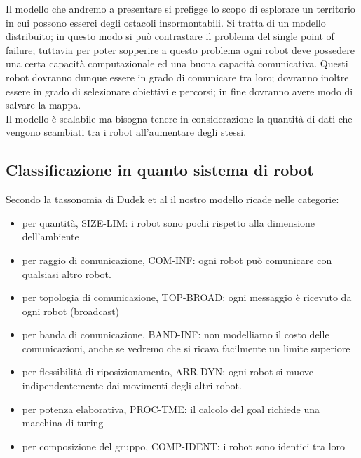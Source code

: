 Il modello che andremo a presentare si prefigge lo scopo di esplorare un territorio
in cui possono esserci degli ostacoli insormontabili. Si tratta di un modello distribuito; in questo modo
si può contrastare il problema del single point of failure; tuttavia per poter
sopperire a questo problema ogni robot deve possedere una certa capacità computazionale ed
una buona capacità comunicativa. Questi robot dovranno dunque essere in grado di comunicare tra loro; dovranno
inoltre essere in grado di selezionare obiettivi e percorsi; in fine dovranno avere modo di salvare la mappa.\\
Il modello è scalabile ma bisogna tenere in considerazione la quantità di dati che vengono scambiati tra i robot
all'aumentare degli stessi.
\subsection{Classificazione in quanto sistema di robot}
Secondo la tassonomia di Dudek et al \cite{dudek1996taxonomy} il nostro modello
ricade nelle categorie:
\begin{itemize}
	\item per quantità, SIZE-LIM: i robot sono pochi rispetto alla dimensione
	      dell'ambiente
	\item per raggio di comunicazione, COM-INF: ogni robot può comunicare con
	      qualsiasi altro robot.
	\item per topologia di comunicazione, TOP-BROAD: ogni messaggio è ricevuto
	      da ogni robot (broadcast)
	\item per banda di comunicazione, BAND-INF: non modelliamo il costo delle
	      comunicazioni, anche se vedremo che si ricava facilmente un limite
	      superiore
	\item per flessibilità di riposizionamento, ARR-DYN: ogni robot si muove
	      indipendentemente dai movimenti degli altri robot.
	\item per potenza elaborativa, PROC-TME: il calcolo del goal richiede una
	      macchina di turing
	\item per composizione del gruppo, COMP-IDENT: i robot sono identici tra loro	
\end{itemize}
